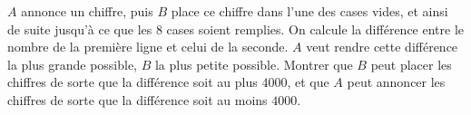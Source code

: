 $A$ annonce un chiffre, puis $B$ place ce chiffre dans l'une des cases vides, et ainsi de suite jusqu'à ce que les $8$ cases soient remplies. On calcule la différence entre le nombre de la première ligne et celui de la seconde. $A$ veut rendre cette différence la plus grande possible, $B$ la plus petite possible. Montrer que $B$ peut placer les chiffres de sorte que la différence soit au plus $4000$, et que $A$ peut annoncer les chiffres de sorte que la différence soit au moins $4000$.
\begin{center}
\end{center}
